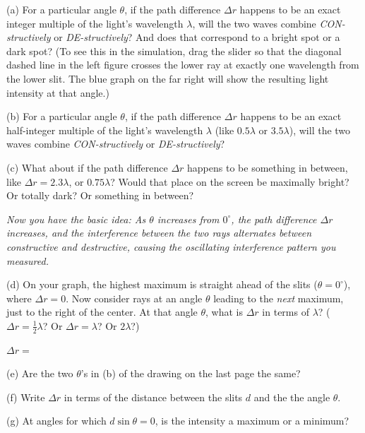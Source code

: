 \pagebreak[2]
(a) For a particular angle $\theta$, if the path difference $\Delta r$ happens to be an exact integer multiple of the light's wavelength $\lambda$, will the two waves combine \textit{CON-structively} or \textit{DE-structively}?  And does that correspond to a bright spot or a dark spot?  (To see this in the simulation, drag the  slider so that the diagonal dashed line in the left figure crosses the lower ray at exactly one wavelength from the lower slit.  The blue graph on the far right will show the resulting light intensity at that angle.)
\answerspace{0.5in}

(b) For a particular angle $\theta$, if the path difference $\Delta r$ happens to be an exact half-integer multiple of the light's wavelength $\lambda$ (like $0.5\lambda$ or $3.5\lambda$), will the two waves combine \textit{CON-structively} or \textit{DE-structively}?
\answerspace{0.5in}

(c) What about if the path difference $\Delta r$ happens to be something in between, like $\Delta r = 2.3\lambda$, or $0.75\lambda$? Would that place on the screen be maximally bright? Or totally dark? Or something in between?
\answerspace{0.5in}

\textit{Now you have the basic idea: As $\theta$ increases from $0^\circ$,
the path difference $\Delta r$ increases, and the interference between the two rays alternates between constructive and destructive, causing the oscillating interference pattern you measured.}


(d) On your graph, the highest maximum is straight ahead of the slits ($\theta=0^\circ$), where $\Delta r=0$.  Now consider rays at an angle $\theta$ leading to the \textit{next} maximum, just to the right of the center.  At that angle $\theta$, what is $\Delta r$ in terms of $\lambda$?   ($\Delta r=\frac{1}{2}\lambda$?  Or $\Delta r = \lambda$?  Or $2\lambda$?) 

\vspace{0.1in}
\hspace{0.8in}$\Delta r=$
\vspace{0.1in}

(e) Are the two $\theta$'s in (b) of the drawing on the last page the same?
\answerspace{0.2in}

(f) Write $\Delta r$ in terms of the distance between the slits $d$ and the the angle $\theta$.
\answerspace{0.4in}

(g) At angles for which $d \sin \theta = 0$, is the intensity a maximum or a minimum?
\answerspace{0.2in}

